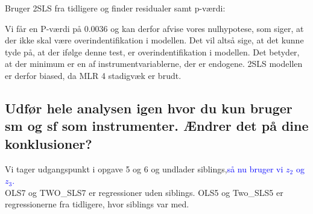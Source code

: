 \documentclass[
  10pt,
]{article}
\newenvironment{Shaded}{\begin{snugshade}}{\end{snugshade}}
\newcommand{\CommentTok}[1]{\textcolor[rgb]{0.56,0.35,0.01}{\textit{#1}}}
\newcommand{\DecValTok}[1]{\textcolor[rgb]{0.00,0.00,0.81}{#1}}
\newcommand{\KeywordTok}[1]{\textcolor[rgb]{0.13,0.29,0.53}{\textbf{#1}}}
\newcommand{\NormalTok}[1]{#1}
\newcommand{\OperatorTok}[1]{\textcolor[rgb]{0.81,0.36,0.00}{\textbf{#1}}}
\newcommand{\StringTok}[1]{\textcolor[rgb]{0.31,0.60,0.02}{#1}}
\begin{document}
Bruger 2SLS fra tidligere og finder residualer samt p-værdi:

\begin{Shaded}
\end{Shaded}

Vi får en P-værdi på 0.0036 og kan derfor afvise vores nulhypotese, som
siger, at der ikke skal være overindentifikation i modellen. Det vil
altså sige, at det kunne tyde på, at der ifølge denne test, er
overindentifikation i modellen. Det betyder, at der minimum er en af
instrumentvariablerne, der er endogene. 2SLS modellen er derfor biased,
da MLR 4 stadigvæk er brudt. \newpage

\hypertarget{udfuxf8r-hele-analysen-igen-hvor-du-kun-bruger-sm-og-sf-som-instrumenter.-uxe6ndrer-det-puxe5-dine-konklusioner}{%
\subsection{Udfør hele analysen igen hvor du kun bruger sm og sf som
instrumenter. Ændrer det på dine
konklusioner?}\label{udfuxf8r-hele-analysen-igen-hvor-du-kun-bruger-sm-og-sf-som-instrumenter.-uxe6ndrer-det-puxe5-dine-konklusioner}}

Vi tager udgangspunkt i opgave 5 og 6 og undlader
siblings,\textcolor{blue}{så nu bruger vi $z_2$ og $z_3$.}\\
OLS7 og TWO\_SLS7 er regressioner uden siblings. OLS5 og Two\_SLS5 er
regressionerne fra tidligere, hvor siblings var med.
\end{document}
